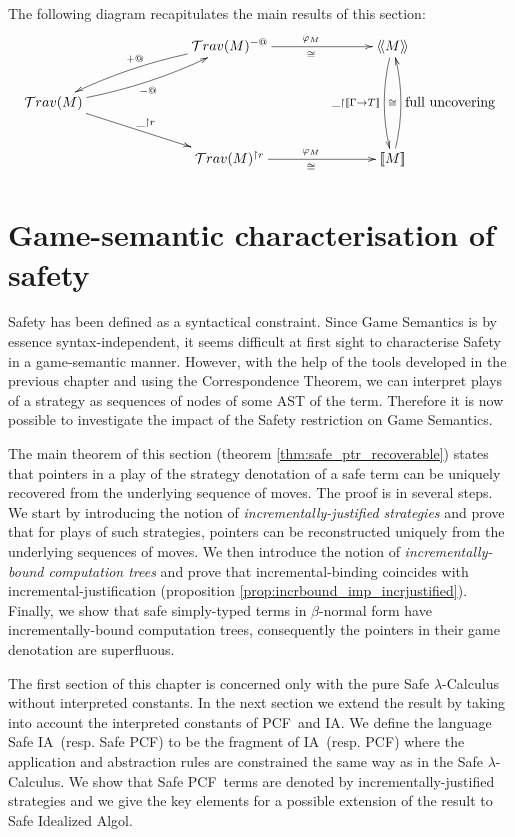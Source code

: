 \documentclass{llncs}
\newcommand\travset{\mathcal{T}rav}
\newcommand{\lsem}{[\![} %
\newcommand{\rsem}{]\!]} %
\newcommand{\sem}[1]{{\lsem #1 \rsem}}
\newcommand{\intersem}[1]{{\langle\!\langle #1 \rangle\!\rangle}}
\newcommand\ialgol{\textsf{IA}}
\newcommand\pcf{\textsf{PCF}}
\begin{document}
The following diagram recapitulates the main results of this section:
$$
\xymatrix @C=6pc{
                                           & \travset(M)^{-@} \ar@/_/[dl]_{+@}  \ar[r]^{\varphi_M}_\cong & \intersem{M} \ar@/_/[dd]_{\_ \upharpoonright \sem{\Gamma\rightarrow T}} \\
\travset(M) \ar@/_/[ur]_{-@}^{} \ar[dr]^{\_ \upharpoonright r}  \\
                                           & \travset(M)^{\upharpoonright r} \ar[r]^{\varphi_M}_\cong & \sem{M} \ar@/_/[uu]^{\cong}_{\mbox{full uncovering}}
}
$$




\section{Game-semantic characterisation of safety}

Safety has been defined as a syntactical constraint. Since Game
Semantics is by essence syntax-independent, it seems difficult at
first sight to characterise Safety in a game-semantic manner.
However, with the help of the tools developed in the previous
chapter and using the Correspondence Theorem, we can interpret plays
of a strategy as sequences of nodes of some AST of the term.
Therefore it is now possible to investigate the impact of the Safety
restriction on Game Semantics.


The main theorem of this section (theorem
\ref{thm:safe_ptr_recoverable}) states that pointers in a play of
the strategy denotation of a safe term can be uniquely recovered
from the underlying sequence of moves. The proof is in several
steps. We start by introducing the notion of
\emph{incrementally-justified strategies} and prove that for plays
of such strategies, pointers can be reconstructed uniquely from the
underlying sequences of moves. We then introduce the notion of
\emph{incrementally-bound computation trees} and prove that
incremental-binding coincides with incremental-justification
(proposition \ref{prop:incrbound_imp_incrjustified}). Finally, we
show that safe simply-typed terms in $\beta$-normal form have
incrementally-bound computation trees, consequently the pointers in
their game denotation are superfluous.


The first section of this chapter is concerned only with the pure
Safe $\lambda$-Calculus without interpreted constants. In the next
section we extend the result by taking into account the interpreted
constants of \pcf\ and \ialgol. We define the language Safe \ialgol\
(resp. Safe \pcf) to be the fragment of \ialgol\ (resp. \pcf) where
the application and abstraction rules are constrained the same way
as in the Safe $\lambda$-Calculus. We show that Safe \pcf\ terms are
denoted by incrementally-justified strategies and we give the key
elements for a possible extension of the result to Safe Idealized
Algol.
\end{document}
